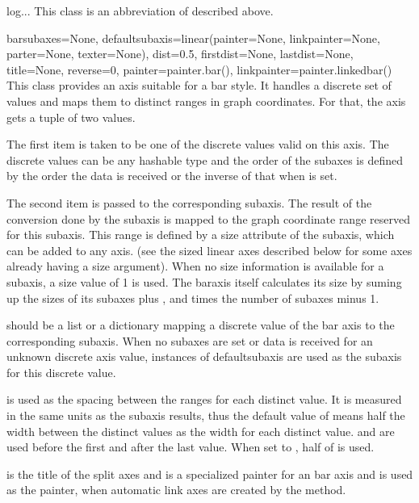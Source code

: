 \begin{classdesc}{log}{...}
This class is an abbreviation of  described above.
\end{classdesc}

\begin{classdesc}{bar}{subaxes=None,
                       defaultsubaxis=linear(painter=None,
                                             linkpainter=None,
                                             parter=None,
                                             texter=None),
                       dist=0.5, firstdist=None, lastdist=None,
                       title=None, reverse=0,
                       painter=painter.bar(),
                       linkpainter=painter.linkedbar()}
  This class provides an axis suitable for a bar style. It handles a
  discrete set of values and maps them to distinct ranges in graph
  coordinates. For that, the axis gets a tuple of two values.

  The first item is taken to be one of the discrete values valid on
  this axis. The discrete values can be any hashable type and the
  order of the subaxes is defined by the order the data is received or
  the inverse of that when  is set.

  The second item is passed to the corresponding subaxis. The result
  of the conversion done by the subaxis is mapped to the graph
  coordinate range reserved for this subaxis. This range is defined by
  a size attribute of the subaxis, which can be added to any axis.
  (see the sized linear axes described below for some axes already
  having a size argument). When no size information is available for a
  subaxis, a size value of 1 is used. The baraxis itself calculates
  its size by suming up the sizes of its subaxes plus ,
   and  times the number of subaxes minus 1.

   should be a list or a dictionary mapping a discrete
  value of the bar axis to the corresponding subaxis. When no subaxes
  are set or data is received for an unknown discrete axis value,
  instances of defaultsubaxis are used as the subaxis for this
  discrete value.

   is used as the spacing between the ranges for each
  distinct value. It is measured in the same units as the subaxis
  results, thus the default value of  means half the width
  between the distinct values as the width for each distinct value.
   and  are used before the first and
  after the last value. When set to , half of 
  is used.

   is the title of the split axes and  is a
  specialized painter for an bar axis and  is used as
  the painter, when automatic link axes are created by the
   method.
\end{classdesc}

